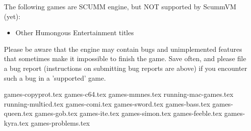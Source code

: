 \begin{itemize}
The following games are SCUMM engine, but NOT supported by ScummVM (yet):

  \begin{itemize}
  \item Other Humongous Entertainment titles
  \end{itemize}

Please be aware that the engine may contain bugs and unimplemented features
that sometimes make it impossible to finish the game. Save often, and please
file a bug report (instructions on submitting bug reports are above) if you
encounter such a bug in a 'supported' game.

\end{itemize}


 {games-copyprot.tex}
 {games-c64.tex}
 {games-mmnes.tex}
 {running-mac-games.tex}
 {running-multicd.tex}
 {games-comi.tex}
 {games-sword.tex}
 {games-bass.tex}
 {games-queen.tex}
 {games-gob.tex}
 {games-ite.tex}
 {games-simon.tex}
 {games-feeble.tex}
 {games-kyra.tex}
 {games-problems.tex}
